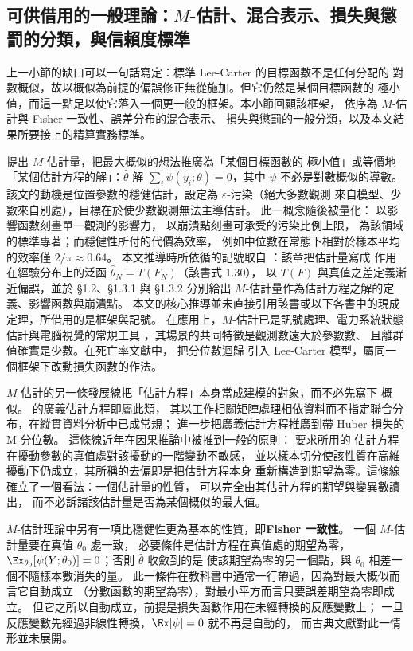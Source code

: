 
\subsection{可供借用的一般理論：$M$-估計、混合表示、損失與懲罰的分類，與信賴度標準}\label{subsec:mest}\label{subsec:mix}\label{subsec:mq}\label{subsec:cred}

上一小節的缺口可以一句話寫定：標準 Lee-Carter 的目標函數不是任何分配的
對數概似，故以概似為前提的偏誤修正無從施加。但它仍然是某個目標函數的
極小值，而這一點足以使它落入一個更一般的框架。本小節回顧該框架，
依序為 $M$-估計與 Fisher 一致性、誤差分布的混合表示、
損失與懲罰的一般分類，以及本文結果所要接上的精算實務標準。

\citet{huber1964} 提出 $M$-估計量，把最大概似的想法推廣為「某個目標函數的
極小值」或等價地「某個估計方程的解」：$\hat\theta$ 解
$\sum_i\psi(y_i;\theta)=0$，其中 $\psi$ 不必是對數概似的導數。
該文的動機是位置參數的穩健估計，設定為 $\varepsilon$-污染（絕大多數觀測
來自模型、少數來自別處），目標在於使少數觀測無法主導估計。
此一概念隨後被量化：\citet{hampel1974} 以影響函數刻畫單一觀測的影響力，
\citet{donoho1983} 以崩潰點刻畫可承受的污染比例上限，
\citet{huber2009} 為該領域的標準專著；而穩健性所付的代價為效率，
例如中位數在常態下相對於樣本平均的效率僅 $2/\pi\approx0.64$。
本文推導時所依循的記號取自 \citet[第 1 章]{zoubir2018}：該章把估計量寫成
作用在經驗分布上的泛函 $\hat\theta_N=T(F_N)$（該書式 1.30），
以 $T(F)$ 與真值之差定義漸近偏誤，並於 §1.2、§1.3.1 與 §1.3.2 分別給出
$M$-估計量作為估計方程之解的定義、影響函數與崩潰點。
本文的核心推導並未直接引用該書或以下各書中的現成定理，所借用的是框架與記號。
在應用上，$M$-估計已是訊號處理、電力系統狀態估計與電腦視覺的常規工具
\citep{zoubir2018}，其場景的共同特徵是觀測數遠大於參數數、
且離群值確實是少數。在死亡率文獻中，\citet{santolino2020} 把分位數迴歸
引入 Lee-Carter 模型，屬同一個框架下改動損失函數的作法。

$M$-估計的另一條發展線把「估計方程」本身當成建模的對象，而不必先寫下
概似。\citet{liang1986} 的廣義估計方程即屬此類，
其以工作相關矩陣處理相依資料而不指定聯合分布，在縱貫資料分析中已成常規；
\citet{merlo2022} 進一步把廣義估計方程推廣到帶 Huber 損失的 M-分位數。
這條線近年在因果推論中被推到一般的原則：\citet{chernozhukov2018} 要求所用的
估計方程在擾動參數的真值處對該擾動的一階變動不敏感，
並以樣本切分使該性質在高維擾動下仍成立，其所稱的去偏即是把估計方程本身
重新構造到期望為零。這條線確立了一個看法：一個估計量的性質，
可以完全由其估計方程的期望與變異數讀出，
而不必訴諸該估計量是否為某個概似的最大值。

$M$-估計理論中另有一項比穩健性更為基本的性質，即\textbf{Fisher 一致性}。
一個 $M$-估計量要在真值 $\theta_0$ 處一致，
必要條件是估計方程在真值處的期望為零，
$\Ex_{\theta_0}[\psi(Y;\theta_0)]=0$；否則 $\hat\theta$ 收斂到的是
使該期望為零的另一個點，與 $\theta_0$ 相差一個不隨樣本數消失的量。
此一條件在教科書中通常一行帶過，因為對最大概似而言它自動成立
（分數函數的期望為零），對最小平方而言只要誤差期望為零即成立。
但它之所以自動成立，前提是損失函數作用在未經轉換的反應變數上；
一旦反應變數先經過非線性轉換，$\Ex[\psi]=0$ 就不再是自動的，
而古典文獻對此一情形並未展開。

